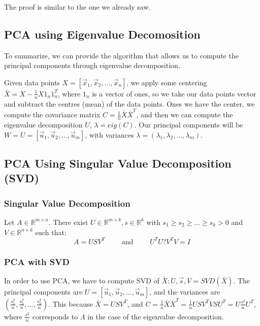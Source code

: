 The proof is similar to the one we already saw.

\subsection{PCA using Eigenvalue Decomosition}
To summarize, we can provide the algorithm that allows us to compute the principal components through eigenvalue decomposition.

Given data points \(X = \left[\vec{x}_1, \vec{x}_2, ..., \vec{x}_n \right]\), we apply some centering \(\bar{X} = X - \frac 1 n X 1_n 1_n^T\), where \(1_n\) is a vector of ones, so we take our data points vector and subtract the centres (mean) of the data points. Ones we have the center, we compute the covariance matrix \(C = \frac 1 n \bar{X} \bar{X}^T\), and then we can compute the eigenvalue decomposition \(U\), \(\lambda = eig(C)\). Our principal components will be \(W = U = \left[ \vec{u}_1, \vec{u}_2, ..., \vec{u}_m \right]\), with variances \(\lambda = \left( \lambda_1, \lambda_2, ..., \lambda_m \right)\).

\subsection{PCA Using Singular Value Decomposition (SVD)}
\subsubsection{Singular Value Decomposition}
Let \(A \in \mathbb{R}^{m \times n}\). There exist \(U \in \mathbb{R}^{m \times k}, s \in \mathbb{R}^k\) with \(s_1 \geq s_2 \geq ... \geq s_k > 0\) and \(V \in \mathbb{R}^{n \times k}\) such that:
\begin{equation}
    A = USV^T \qquad \text{ and } \qquad U^TU ? V^TV = I
\end{equation}

\subsubsection{PCA with SVD}
In order to use PCA, we have to compute SVD of \(\bar{X}: U, \vec{s}, V = SVD(\bar{X})\). The principal components are \(U = \left[ \vec{u}_1, \vec{u}_2, ..., \vec{u}_m \right]\), and the variances are \(\left( \frac {s_1^2} n, \frac {s_2^2} n, ...,  \frac {s_k^2} n \right)\). This because \(\bar{X} = USV^T\), and \(C = \frac 1 n \bar{X} \bar{X}^T = \frac 1 n USV^T VSU^T = U \frac {s^2} n U^T\), where \(\frac {s^2} n\) corresponds to \(\Lambda\) in the case of the eigenvalue decomposition.

